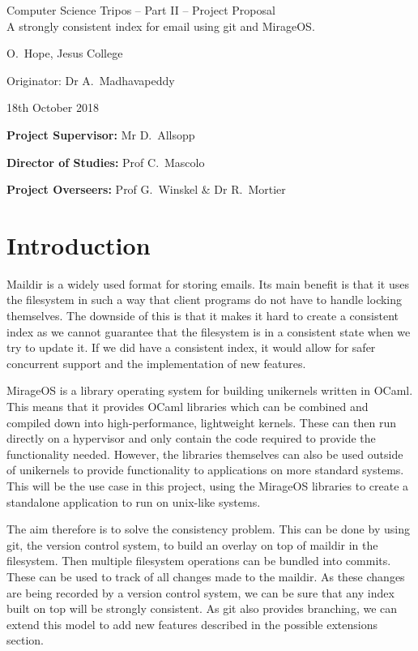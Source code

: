 \documentclass[12pt,a4paper,twoside]{article}
\begin{document}
\begin{center}
    \Large
    Computer Science Tripos -- Part II -- Project Proposal\\[4mm]
    \LARGE
    A strongly consistent index for email using git and MirageOS.

    \large
    O.~Hope, Jesus College

    Originator: Dr A.~Madhavapeddy

    18th October 2018
\end{center}

\vspace{5mm}

\textbf{Project Supervisor:} Mr D.~Allsopp

\textbf{Director of Studies:} Prof C.~Mascolo

\textbf{Project Overseers:} Prof G.~Winskel \& Dr R.~Mortier


\section*{Introduction}

Maildir is a widely used format for storing emails. Its main benefit is that it uses the filesystem in such a way that client programs do not have to handle locking themselves. The downside of this is that it makes it hard to create a consistent index as we cannot guarantee that the filesystem is in a consistent state when we try to update it. If we did have a consistent index, it would allow for safer concurrent support and the implementation of new features.

MirageOS is a library operating system for building unikernels written in OCaml. This means that it provides OCaml libraries which can be combined and compiled down into high-performance, lightweight kernels. These can then run directly on a hypervisor and only contain the code required to provide the functionality needed. However, the libraries themselves can also be used outside of unikernels to provide functionality to applications on more standard systems. This will be the use case in this project, using the MirageOS libraries to create a standalone application to run on unix-like systems.

The aim therefore is to solve the consistency problem. This can be done by using git, the version control system, to build an overlay on top of maildir in the filesystem. Then multiple filesystem operations can be bundled into commits. These can be used to track of all changes made to the maildir. As these changes are being recorded by a version control system, we can be sure that any index built on top will be strongly consistent. As git also provides branching, we can extend this model to add new features described in the possible extensions section.
\end{document}
